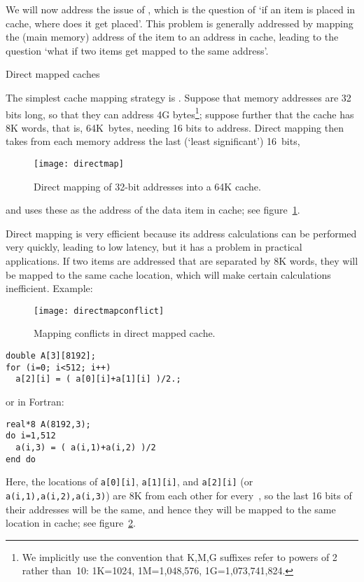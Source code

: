 We will now address the issue
of , which is the question of `if
an item is placed in cache, where does it get placed'. This problem is
generally addressed by mapping the (main memory) address of the item
to an address in cache, leading to the question `what if two items get
mapped to the same address'.

 {Direct mapped caches}
\label{sec:directmap}

The simplest cache mapping strategy is . Suppose that memory addresses are 32 bits long, so that
they can address 4G bytes\footnote
  {We implicitly use the convention
  that K,M,G suffixes refer to powers of 2 rather than~10: 1K=1024,
  1M=1,048,576, 1G=1,073,741,824.}; suppose further that the
cache has 8K words, that is, 64K~bytes, needing 16 bits to address.
Direct mapping then takes from each memory address the last (`least
significant') 16~bits,
\begin{figure}[ht]
  \texttt{[image: directmap]}
  \caption{Direct mapping of 32-bit addresses into a 64K cache.}
  \label{fig:directmap}
\end{figure}
and uses these as the address of the data item in cache; see figure~\ref{fig:directmap}.

Direct mapping is very efficient because its address calculations
can be performed very quickly, leading to low latency, but it
has a problem in practical applications. If two items are addressed
that are separated by 8K words, they will be mapped to the same cache
location, which will make certain calculations inefficient. Example:
%
\begin{figure}[ht]
  \texttt{[image: directmapconflict]}
  \caption{Mapping conflicts in direct mapped cache.}
  \label{fig:directconflict}
\end{figure}
%
\begin{verbatim}
double A[3][8192];
for (i=0; i<512; i++)
  a[2][i] = ( a[0][i]+a[1][i] )/2.;
\end{verbatim}
or in Fortran:
\begin{verbatim}
real*8 A(8192,3);
do i=1,512
  a(i,3) = ( a(i,1)+a(i,2) )/2
end do
\end{verbatim}
Here, the locations of \texttt{a[0][i]}, \texttt{a[1][i]}, and
\texttt{a[2][i]} (or \texttt{a(i,1),a(i,2),a(i,3)})
are 8K from each other for every~, so the last
16 bits of their addresses will be the same, and hence they will
be mapped to the same location in cache; see figure~\ref{fig:directconflict}.

